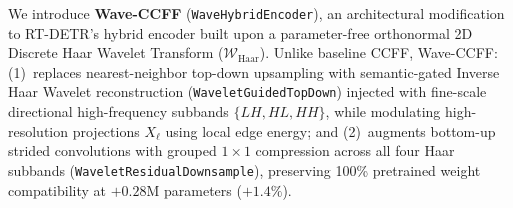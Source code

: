 \documentclass[8pt,a4paper]{article}
\begin{document}
We introduce \textbf{Wave-CCFF} (\texttt{WaveHybridEncoder}), an architectural modification to RT-DETR's hybrid encoder built upon a parameter-free orthonormal 2D Discrete Haar Wavelet Transform ($\mathcal{W}_{\text{Haar}}$). Unlike baseline CCFF, Wave-CCFF: (1)~replaces nearest-neighbor top-down upsampling with semantic-gated Inverse Haar Wavelet reconstruction (\texttt{WaveletGuidedTopDown}) injected with fine-scale directional high-frequency subbands $\{LH, HL, HH\}$, while modulating high-resolution projections $X_\ell$ using local edge energy; and (2)~augments bottom-up strided convolutions with grouped $1\times 1$ compression across all four Haar subbands (\texttt{WaveletResidualDownsample}), preserving 100\% pretrained weight compatibility at $+0.28\text{M}$ parameters ($+1.4\%$).

\end{document}
